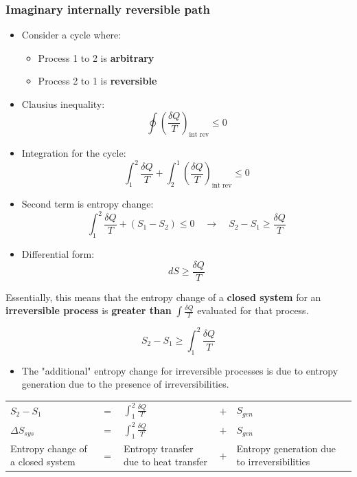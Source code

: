 \documentclass[11pt]{article}
\begin{document}
 \newpage
\subsubsection{Imaginary internally reversible path}
\label{sec:orgcd69901}
\begin{itemize}
\item Consider a cycle where:
\begin{itemize}
\item Process 1 to 2 is \textbf{arbitrary}
\item Process 2 to 1 is \textbf{reversible}
\end{itemize}
\item Clausius inequality:
\[\oint \left(\frac{\delta Q}{T} \right)_{\text{int rev}} \le 0\]
\item Integration for the cycle:
\[\int_1^2 \frac{\delta Q}{T} + \int_2^1 \left(\frac{\delta Q}{T} \right)_{\text{int rev}} \le 0\]
\item Second term is entropy change:
\[\int_1^2 \frac{\delta Q}{T} + (S_1 - S_2) \le 0 \quad \rightarrow \quad S_2 - S_1 \ge \frac{\delta Q}{T}\]
\item Differential form:
\[dS \ge \frac{\delta Q}{T}\]
\end{itemize}

Essentially, this means that the entropy change of a \textbf{closed system} for an \textbf{irreversible process} is \textbf{greater than} \(\int \frac{\delta Q}{T}\) evaluated for that process.

\[S_2 - S_1 \ge \int_1^2 \frac{\delta Q}{T}\]

\begin{itemize}
\item The "additional" entropy change for irreversible processes is due to entropy generation due to the presence of irreversibilities.
\end{itemize}

\begin{tabular}{ >{\centering\arraybackslash}m{10em} >{\centering\arraybackslash}m{1em} >{\centering\arraybackslash}m{10em} >{\centering\arraybackslash}m{1em} >{\centering\arraybackslash}m{10em} }
\(S_2 - S_1\) & \(=\) & \(\int_1^2 \frac{\delta Q}{T}\) & \(+\) & \(S_{gen}\) \\
\(\Delta S_{sys}\) & \(=\) & \(\int_1^2 \frac{\delta Q}{T}\) & \(+\) & \(S_{gen}\) \\
Entropy change of a closed system & \(=\) & Entropy transfer due to heat transfer & \(+\) & Entropy generation due to irreversibilities \\
\end{tabular}
\end{document}
